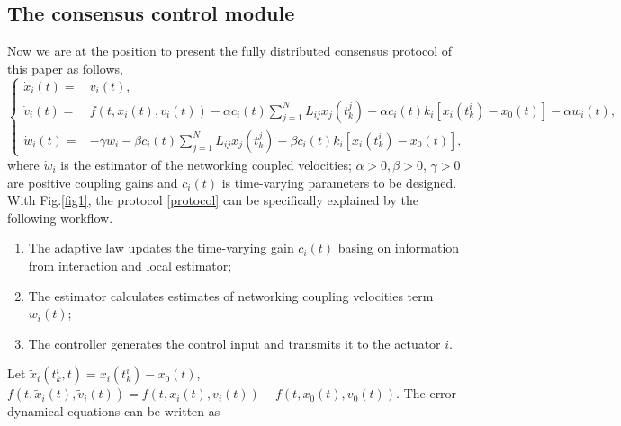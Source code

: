 \documentclass[review]{elsarticle}
\begin{document}
\subsection{The consensus control module}
Now we are at the position to present the fully distributed consensus protocol of this paper as follows,
\begin{equation}\label{protocol}
\left\{\begin{aligned}
\dot x_i(t) =& v_i(t),\\
\dot v_i(t) =& f\left(t,x_i(t),v_i(t) \right)  - \alpha c_i(t)\sum_{j=1}^{N}L_{ij}  {x}_j (t_k^j) 
-\alpha c_i(t)k_i  \left[ {x}_i (t_k^i) - {x}_0 (t) \right] - \alpha w_i(t),\\
\dot{w}_i(t)=& -\gamma w_ i -\beta c_i(t)\sum_{j=1}^{N}L_{ij}  {x}_j (t_k^j) 
-\beta c_i(t)k_i  \left[ {x}_i (t_k^i) - {x}_0 (t) \right],
\end{aligned}\right.
\end{equation}
where $\dot w_i$ is the estimator of the networking coupled velocities; $\alpha>0, \beta>0$, $\gamma>0$ are positive coupling gains and $c_i(t)$ is time-varying parameters to be designed.
With Fig.\ref{fig1}, the protocol \eqref{protocol} can be specifically explained by the following workflow. 
\begin{enumerate}
	\item  The adaptive law updates the time-varying gain $c_i(t)$ basing on information from interaction and local estimator;
	\item  The estimator calculates estimates of networking coupling velocities term $w_i(t)$;
	\item  The controller generates the control input and transmits it to the actuator $i$.  
\end{enumerate}


Let  $\tilde{x}_i(t_k^i,t) ={x}_i (t_k^i) - {x}_0 (t)$, $f\left(t,\tilde{x}_i(t),\tilde{v}_i(t) \right) = f\left(t,x_i(t),v_i(t) \right)  - f\left(t,x_0(t),v_0(t) \right)$. The error dynamical equations can be written as 
\end{document}
